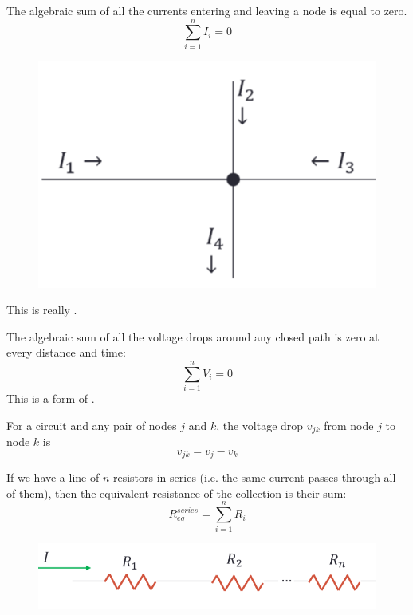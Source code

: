 \begin{thm}
    The algebraic sum of all the currents entering and leaving a node is equal to zero. \begin{equation*}
        \sum_{i=1}^nI_i = 0
    \end{equation*}
    \begin{figure}[H]
        \centering
        \includegraphics[scale = 0.8]{Images/TH2.PNG}
    \end{figure}
    This is really .
\end{thm}

\begin{thm}
    The algebraic sum of all the voltage drops around any closed path is zero at every distance and time: \begin{equation*}
        \sum_{i=1}^nV_i = 0
    \end{equation*}
    This is a form of .
\end{thm}

For a circuit and any pair of nodes $j$ and $k$, the voltage drop $v_{jk}$ from node $j$ to node $k$ is $$v_{jk} = v_j - v_k$$


\begin{thm}
    If we have a line of $n$ resistors in series (i.e. the same current passes through all of them), then the equivalent resistance of the collection is their sum: $$R_{eq}^{series} = \sum_{i=1}^nR_i$$
    \begin{figure}[H]
        \centering
        \includegraphics[scale = 0.8]{Images/TH3.PNG}
    \end{figure}
\end{thm}


